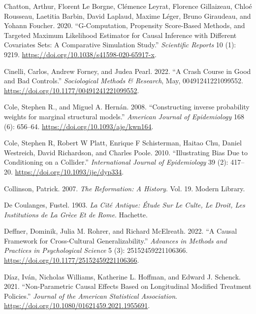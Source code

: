 \documentclass[
  singlecolumn]{report}
\newlength{\cslhangindent}
\newlength{\cslentryspacingunit} %
\newenvironment{CSLReferences}[2] %
 {%
  \setlength{\parindent}{0pt}
  \ifodd #1
  \let\oldpar\par
  \def\par{\hangindent=\cslhangindent\oldpar}
  \fi
  \setlength{\parskip}{#2\cslentryspacingunit}
 }%
 {}
\begin{document}
\begin{CSLReferences}{1}{0}
\leavevmode{}%
Chatton, Arthur, Florent Le Borgne, Clémence Leyrat, Florence
Gillaizeau, Chloé Rousseau, Laetitia Barbin, David Laplaud, Maxime
Léger, Bruno Giraudeau, and Yohann Foucher. 2020. {``G-Computation,
Propensity Score-Based Methods, and Targeted Maximum Likelihood
Estimator for Causal Inference with Different Covariates Sets: A
Comparative Simulation Study.''} \emph{Scientific Reports} 10 (1): 9219.
\url{https://doi.org/10.1038/s41598-020-65917-x}.

\leavevmode{}%
Cinelli, Carlos, Andrew Forney, and Judea Pearl. 2022. {``A Crash Course
in Good and Bad Controls.''} \emph{Sociological Methods \& Research},
May, 00491241221099552. \url{https://doi.org/10.1177/00491241221099552}.

\leavevmode{}%
Cole, Stephen R., and Miguel A. Hernán. 2008. {``Constructing inverse
probability weights for marginal structural models.''} \emph{American
Journal of Epidemiology} 168 (6): 656--64.
\url{https://doi.org/10.1093/aje/kwn164}.

\leavevmode{}%
Cole, Stephen R, Robert W Platt, Enrique F Schisterman, Haitao Chu,
Daniel Westreich, David Richardson, and Charles Poole. 2010.
{``Illustrating Bias Due to Conditioning on a Collider.''}
\emph{International Journal of Epidemiology} 39 (2): 417--20.
\url{https://doi.org/10.1093/ije/dyp334}.

\leavevmode{}%
Collinson, Patrick. 2007. \emph{The Reformation: A History}. Vol. 19.
Modern Library.

\leavevmode{}%
De Coulanges, Fustel. 1903. \emph{La Cité Antique: Étude Sur Le Culte,
Le Droit, Les Institutions de La Grèce Et de Rome}. Hachette.

\leavevmode{}%
Deffner, Dominik, Julia M. Rohrer, and Richard McElreath. 2022. {``A
Causal Framework for Cross-Cultural Generalizability.''} \emph{Advances
in Methods and Practices in Psychological Science} 5 (3):
25152459221106366. \url{https://doi.org/10.1177/25152459221106366}.

\leavevmode{}%
Díaz, Iván, Nicholas Williams, Katherine L. Hoffman, and Edward J.
Schenck. 2021. {``Non-Parametric Causal Effects Based on Longitudinal
Modified Treatment Policies.''} \emph{Journal of the American
Statistical Association}.
\url{https://doi.org/10.1080/01621459.2021.1955691}.


\end{CSLReferences}
\end{document}
